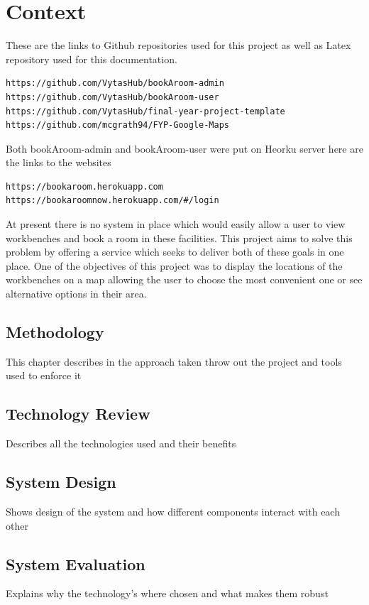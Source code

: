 \chapter{Context}
\begin{itemize}

These are the links to Github repositories used for this project as well as Latex repository used for this documentation.
\bigbreak
\begin{verbatim}
https://github.com/VytasHub/bookAroom-admin
https://github.com/VytasHub/bookAroom-user
https://github.com/VytasHub/final-year-project-template
https://github.com/mcgrath94/FYP-Google-Maps
\end{verbatim}


Both bookAroom-admin and bookAroom-user were put on Heorku server here are the links to the websites
\bigbreak

\begin{verbatim}
https://bookaroom.herokuapp.com
https://bookaroomnow.herokuapp.com/#/login
\end{verbatim}



At present there is no system in place which would easily allow a user to view workbenches and book a room in these facilities. This project aims to solve this problem by offering a service which seeks to deliver both of these goals in one place.
One of the objectives of this project was to display the locations of the workbenches on a map allowing the user to choose the most convenient one or see alternative options in their area.

\section{Methodology}
This chapter describes in the approach taken throw out the project and tools used to enforce it
\section{Technology Review}
Describes all the technologies used and their benefits
\section{System Design}
Shows design of the system and how different components interact with each other
\section{System Evaluation}
Explains why the technology's where chosen and what makes them robust

\end{itemize}
